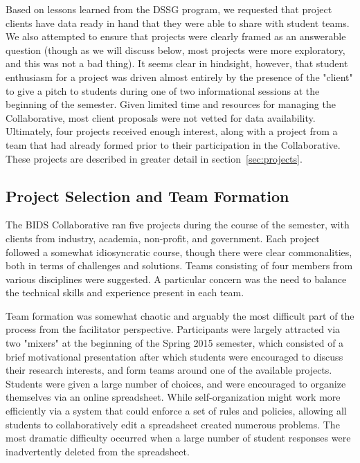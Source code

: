 \documentclass{sig-alternate}
\begin{document}
Based on lessons learned from the DSSG program, we requested that project clients have data ready in hand that they were able to share with student teams. We also attempted to ensure that projects were clearly framed as an answerable question (though as we will discuss below, most projects were more exploratory, and this was not a bad thing). It seems clear in hindsight, however, that student enthusiasm for a project was driven almost entirely by the presence of the "client" to give a pitch to students during one of two informational sessions at the beginning of the semester. Given limited time and resources for managing the Collaborative, most client proposals were not vetted for data availability. Ultimately, four projects received enough interest, along with a project from a team that had already formed prior to their participation in the Collaborative.  These projects are described in greater detail in section~\ref{sec:projects}.

\subsection{Project Selection and Team Formation}

The BIDS Collaborative ran five projects during the course of the semester, with clients from industry, academia, non-profit, and government. Each project followed a somewhat idiosyncratic course, though there were clear commonalities, both in terms of challenges and solutions. Teams consisting of four members from various disciplines were suggested. A particular concern was the need to balance the technical skills and experience present in each team.

Team formation was somewhat chaotic and arguably the most difficult part of the process from the facilitator perspective. Participants were largely attracted via two "mixers" at the beginning of the Spring 2015 semester, which consisted of a brief motivational presentation after which students were encouraged to discuss their research interests, and form teams around one of the available projects. Students were given a large number of choices, and were encouraged to organize themselves via an online spreadsheet. While self-organization might work more efficiently via a system that could enforce a set of rules and policies, allowing all students to collaboratively edit a spreadsheet created numerous problems. The most dramatic difficulty occurred when a large number of student responses were inadvertently deleted from the spreadsheet.
\end{document}
